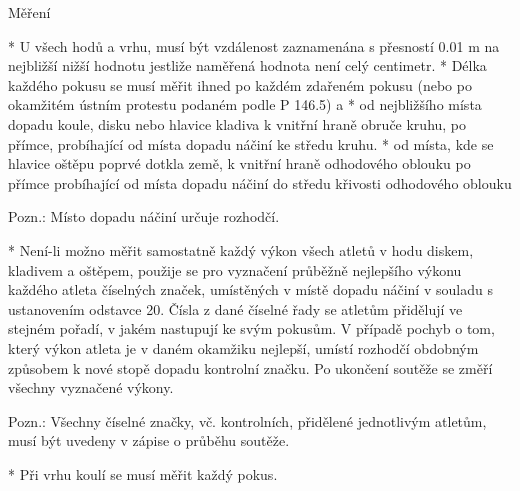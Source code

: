 Měření

* U všech hodů a vrhu, musí být vzdálenost zaznamenána s přesností 0.01 m na nejbližší nižší hodnotu jestliže naměřená hodnota není celý centimetr.
* Délka každého pokusu se musí měřit ihned po každém zdařeném pokusu (nebo po okamžitém ústním protestu podaném podle P 146.5)
  \begitems \style a
  * od nejbližšího místa dopadu koule, disku nebo hlavice kladiva k vnitřní hraně obruče kruhu, po přímce, probíhající od místa dopadu náčiní ke středu kruhu.
  * od místa, kde se hlavice oštěpu poprvé dotkla země, k vnitřní hraně odhodového oblouku po přímce probíhající od místa dopadu náčiní do středu křivosti odhodového oblouku
  \enditems

Pozn.: Místo dopadu náčiní určuje rozhodčí.

* Není-li možno měřit samostatně každý výkon všech atletů v hodu diskem, kladivem a oštěpem, použije se pro vyznačení průběžně nejlepšího výkonu každého atleta číselných značek, umístěných v místě dopadu náčiní v souladu s ustanovením odstavce 20. Čísla z dané číselné řady se atletům přidělují ve stejném pořadí, v jakém nastupují ke svým pokusům. V případě pochyb o tom, který výkon atleta je v daném okamžiku nejlepší, umístí rozhodčí obdobným způsobem k nové stopě dopadu kontrolní značku. Po ukončení soutěže se změří všechny vyznačené výkony.

Pozn.: Všechny číselné značky, vč. kontrolních, přidělené jednotlivým atletům, musí být uvedeny v zápise o průběhu soutěže.

* Při vrhu koulí se musí měřit každý pokus.
\enditems

\endinput